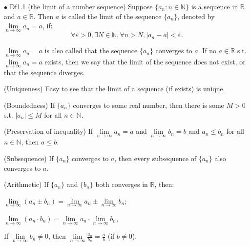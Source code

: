 \documentclass{article}
\begin{document}
\begin{Df}{$\bullet$ Df1.1 (the limit of a number sequence)}
    Suppose $\{a_n: n\in\mathbb{N}\}$ is a sequence in $\mathbb{R}$ and $a\in\mathbb{R}$. Then $a$ is called the limit of the sequence $\{a_n\}$, denoted by $\lim\limits_{n\to\infty}a_n=a$, if: 
    $$\forall \varepsilon>0, \exists N\in\mathbb{N}, \forall n > N, |a_n-a|<\varepsilon.$$
\end{Df}

\begin{Rmk}{}
    \begin{compactenum}
        \item \textcolor{Df}{$\lim\limits_{n\to\infty}a_n=a$ is also called that the sequence $\{a_n\}$ converges to $a$. If no $a\in\mathbb{R}$ s.t. $\lim\limits_{n\to\infty}a_n=a$ exists, then we say that the limit of the sequence does not exist, or that the sequence diverges.}
        \item \textcolor{Th}{(Uniqueness) Easy to see that the limit of a sequence (if exists) is unique.}
        \item \textcolor{Th}{(Boundedness) If $\{a_n\}$ converges to some real number, then there is some $M>0$ s.t. $|a_n|\leq M$ for all $n\in\mathbb{N}$.}
        \item \textcolor{Th}{(Preservation of inequality) If $\lim\limits_{n\to\infty}a_n=a$ and $\lim\limits_{n\to\infty}b_n=b$ and $a_n\leq b_n$ for all $n\in\mathbb{N}$, then $a\leq b$.}
        \item \textcolor{Th}{(Subsequence) If $\{a_n\}$ converges to $a$, then every subsequence of $\{a_n\}$ also converges to $a$.}
        \item \textcolor{Th}{(Arithmetic) If $\{a_n\}$ and $\{b_n\}$ both converges in $\mathbb{R}$, then:
            \begin{compactitem}
                \item $\lim\limits_{n\to\infty}(a_n\pm b_n)=\lim\limits_{n\to\infty}a_n\pm \lim\limits_{n\to\infty}b_n$; 
                \item $\lim\limits_{n\to\infty}(a_n\cdot b_n)=\lim\limits_{n\to\infty}a_n\cdot \lim\limits_{n\to\infty}b_n$, 
                \item If $\lim\limits_{n\to\infty} b_n\neq 0$, then $\lim\limits_{n\to\infty}\frac{a_n}{b_n}=\frac{a}{b}$ (if $b\neq 0$).
            \end{compactitem}
        }
    \end{compactenum}
\end{Rmk}
\end{document}
